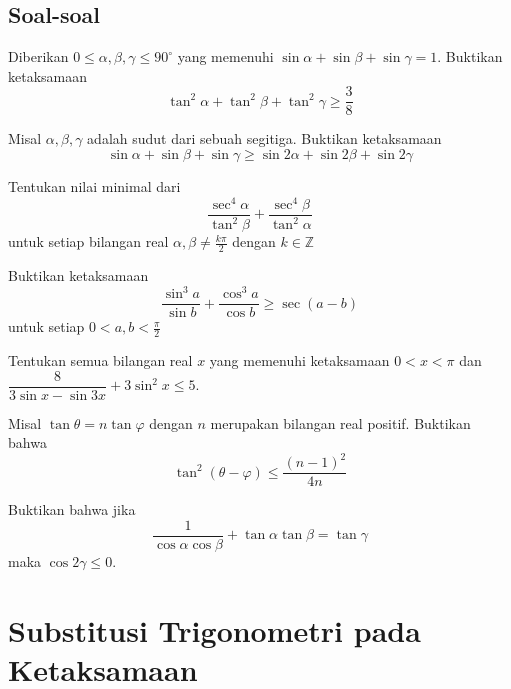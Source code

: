 \documentclass[11pt]{scrartcl}
\begin{document}
\subsection{Soal-soal}
\begin{problem}
    Diberikan $0 \leq \alpha, \beta, \gamma \leq 90^{\circ}$ yang memenuhi $\sin{\alpha} + \sin{\beta} + \sin{\gamma} = 1$. Buktikan ketaksamaan \[\tan^2{\alpha} + \tan^2{\beta} + \tan^2{\gamma} \geq \dfrac{3}{8}\]
\end{problem}

\begin{problem}
    Misal $\alpha, \beta, \gamma$ adalah sudut dari sebuah segitiga. Buktikan ketaksamaan \[\sin{\alpha} + \sin{\beta} + \sin{\gamma} \geq \sin{2\alpha} + \sin{2\beta} + \sin{2\gamma}\]
\end{problem}

\begin{problem}
    Tentukan nilai minimal dari \[\dfrac{\sec^4{\alpha}}{\tan^2{\beta}} + \dfrac{\sec^4{\beta}}{\tan^2{\alpha}}\] untuk setiap bilangan real $\alpha, \beta \neq \frac{k\pi}{2}$ dengan $k \in \mathbb{Z}$
\end{problem}

\begin{problem}
    Buktikan ketaksamaan \[\dfrac{\sin^3{a}}{\sin{b}} + \dfrac{\cos^3{a}}{\cos{b}} \geq \sec{(a - b)}\] untuk setiap $0 < a, b < \frac{\pi}{2}$
\end{problem}

\begin{problem}
    Tentukan semua bilangan real $x$ yang memenuhi ketaksamaan $0 < x < \pi$ dan $\dfrac{8}{3 \sin x - \sin 3x} + 3\sin^2 x \leq 5$.
\end{problem}

\begin{problem}
    Misal $\tan{\theta} = n \tan{\varphi}$ dengan $n$ merupakan bilangan real positif. Buktikan bahwa \[\tan^2{(\theta - \varphi)} \leq \dfrac{(n - 1)^2}{4n}\]
\end{problem}

\begin{problem}
    Buktikan bahwa jika \[\dfrac{1}{\cos{\alpha}\cos{\beta}}+ \tan{\alpha}\tan{\beta} = \tan{\gamma}\] maka $\cos{2\gamma} \leq 0$.
\end{problem}

\section{Substitusi Trigonometri pada Ketaksamaan}
\end{document}
